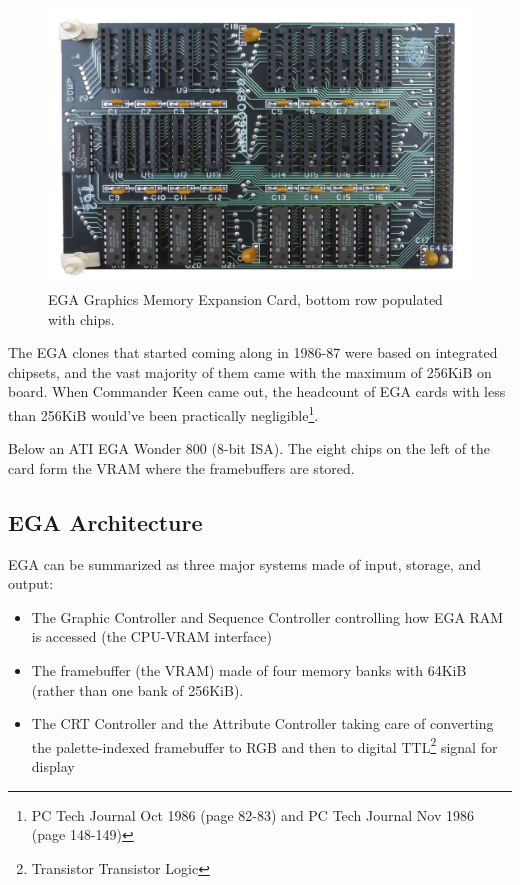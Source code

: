 \documentclass[book.tex]{subfiles}
\begin{document}
\begin{figure}[H]
  \centering 
  \includegraphics[width=1.0\textwidth]{screenshots_300dpi/hardware/ibm_ega_graphics_memory_expansion_card.png} 
  \caption{EGA Graphics Memory Expansion Card, bottom row populated with chips.}
  \label{fig:ibm_ega_card}
\end{figure}






\par
The EGA clones that started coming along in 1986-87 were based on integrated chipsets, and the vast majority of them came with the maximum of 256KiB on board. When Commander Keen came out, the headcount of EGA cards with less than 256KiB would've been practically negligible\footnote{PC Tech Journal Oct 1986 (page 82-83) and PC Tech Journal Nov 1986 (page 148-149)}.\\

\par
Below an ATI EGA Wonder 800 (8-bit ISA). The eight chips on the left of the card form the VRAM where the framebuffers are stored. 

\begin{figure}[H] 
  \centering 
  
\end{figure}
\par
\pagebreak




\subsection{EGA Architecture}

EGA can be summarized as three major systems made of input, storage, and output:
\begin{itemize}
\item The Graphic Controller and Sequence Controller controlling how EGA RAM is accessed (the CPU-VRAM interface)
\item The framebuffer (the VRAM) made of four memory banks with 64KiB (rather than one bank of 256KiB).  
\item The CRT Controller and the Attribute Controller taking care of converting the palette-indexed framebuffer to RGB and then to digital TTL\footnote{Transistor Transistor Logic} signal for display
\end{itemize}
\end{document}

